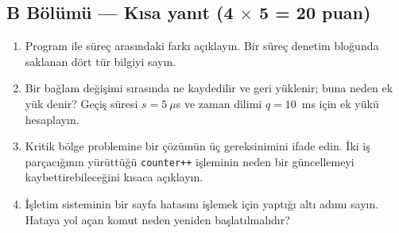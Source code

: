 \documentclass[11pt,a4paper]{article}
\begin{document}
\subsection*{B Bölümü --- Kısa yanıt \hfill (4 $\times$ 5 = 20 puan)}
\begin{enumerate}[leftmargin=2.0em,label=B\arabic*.,itemsep=0.4em]
  \item Program ile süreç arasındaki farkı açıklayın. Bir süreç denetim bloğunda saklanan dört tür bilgiyi sayın.
  \item Bir bağlam değişimi sırasında ne kaydedilir ve geri yüklenir; buna neden ek yük denir? Geçiş süresi $s = 5\ \mu$s ve zaman dilimi $q = 10$~ms için ek yükü hesaplayın.
  \item Kritik bölge problemine bir çözümün üç gereksinimini ifade edin. İki iş parçacığının yürüttüğü \texttt{counter++} işleminin neden bir güncellemeyi kaybettirebileceğini kısaca açıklayın.
  \item İşletim sisteminin bir sayfa hatasını işlemek için yaptığı altı adımı sayın. Hataya yol açan komut neden yeniden başlatılmalıdır?
\end{enumerate}
\end{document}
